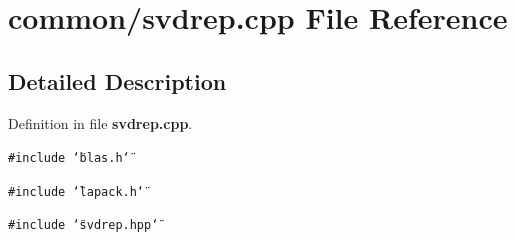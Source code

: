 \section{common/svdrep.cpp File Reference}
\label{svdrep_8cpp}


\subsection{Detailed Description}


Definition in file {\bf svdrep.cpp}.

{\tt \#include \char`\"{}blas.h\char`\"{}}\par
{\tt \#include \char`\"{}lapack.h\char`\"{}}\par
{\tt \#include \char`\"{}svdrep.hpp\char`\"{}}\par
